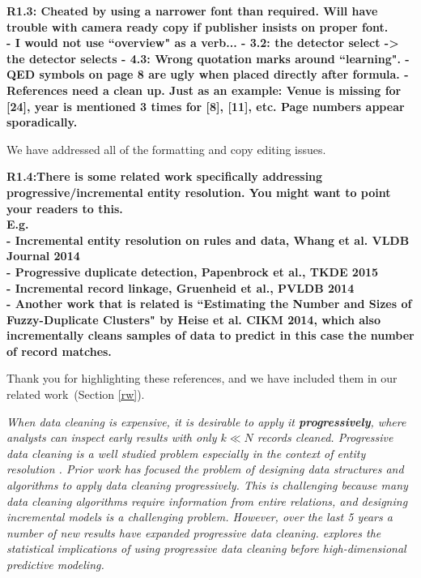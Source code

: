 \vspace{0.5em}

\noindent\textbf{R1.3: Cheated by using a narrower font than required. Will have trouble with camera ready copy if publisher insists on proper font.\\
- I would not use ``overview" as a verb...
- 3.2: the detector select -> the detector selects
- 4.3: Wrong quotation marks around ``learning".
- QED symbols on page 8 are ugly when placed directly after formula. 
- References need a clean up. Just as an example: Venue is missing for [24], year is mentioned 3 times for [8], [11], etc. Page numbers appear sporadically.}

We have addressed all of the formatting and copy editing issues.

\vspace{0.5em}

\noindent\textbf{R1.4:There is some related work specifically addressing progressive/incremental entity resolution. You might want to point your readers to this.
\\E.g.
\\- Incremental entity resolution on rules and data, Whang et al. VLDB Journal 2014
\\- Progressive duplicate detection, Papenbrock et al., TKDE 2015
\\- Incremental record linkage, Gruenheid et al., PVLDB 2014
\\- Another work that is related is ``Estimating the Number and Sizes of Fuzzy-Duplicate Clusters" by Heise et al. CIKM 2014, which also incrementally cleans samples of data to predict in this case the number of record matches.}

Thank you for highlighting these references, and we have included them in our related work~(Section \ref{rw}).

\emph{When data cleaning is expensive, it is desirable to apply it \textbf{progressively}, where analysts can inspect early results with only $k \ll N$ records cleaned.
Progressive data cleaning is a well studied problem especially in the context of entity resolution \cite{altowim2014progressive, whang2014incremental, papenbrock2015progressive, gruenheid2014incremental}.
Prior work has focused the problem of designing data structures and algorithms to apply data cleaning progressively.
This is challenging because many data cleaning algorithms require information from entire relations, and designing incremental models is a challenging problem.
However, over the last 5 years a number of new results have expanded progressive data cleaning\cite{mayfield2010eracer, DBLP:journals/pvldb/YakoutENOI11, yakout2013don}.
\sys explores the statistical implications of using progressive data cleaning before high-dimensional predictive modeling.}


